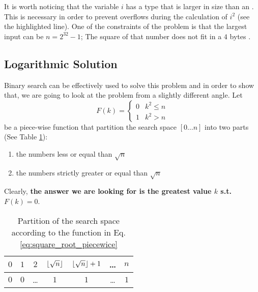 

It is worth noticing that the variable $i$ has a type that is larger in size than an
. This is necessary in order to prevent overflows during the calculation of $i^2$ (see the highlighted line). 
One of the constraints of the problem is that the largest input can be $n=2^{32}-1$; The square of that number does not fit in a $4$ bytes .
	
	


\subsection{Logarithmic Solution}
Binary search can be effectively used to solve this problem and in order to show that, we are going to look at the problem from a slightly different angle. 
Let 
\begin{equation}
	F(k)=\begin{cases} 
	0 & k^2 \leq n \\
	1 & k^2 > n
\end{cases}
\label{eq:square_root_piecewice}
\end{equation} 
be a piece-wise function that partition the search space $[0\ldots n]$ into two parts (See Table
\ref{tab:sqrt_split_space}):
	\begin{enumerate}
      \item the numbers  less or equal than $\sqrt{n}$
      \item the numbers strictly greater or equal than $\sqrt{n}$
	\end{enumerate}
Clearly, \textbf{the answer we are looking for is the greatest value $k$ s.t. $F(k) = 0$}. 

\begin{table}
	\centering
	\begin{tabular}{|c|c|c|c|c|c|c|}
		\hline
		$0$ & $1$ & $2$   & $\lfloor\sqrt{n}\rfloor$ & $\lfloor\sqrt{n}\rfloor+1$ & \ldots   & $n$ \\ \hline
		$0$ & $0$ & \ldots & $1$ & $1$ & \ldots & $1$   \\ \hline
	\end{tabular}
	\caption{Partition of the search space according to the function in Eq.
	\ref{eq:square_root_piecewice}}
	\label{tab:sqrt_split_space}
\end{table}

